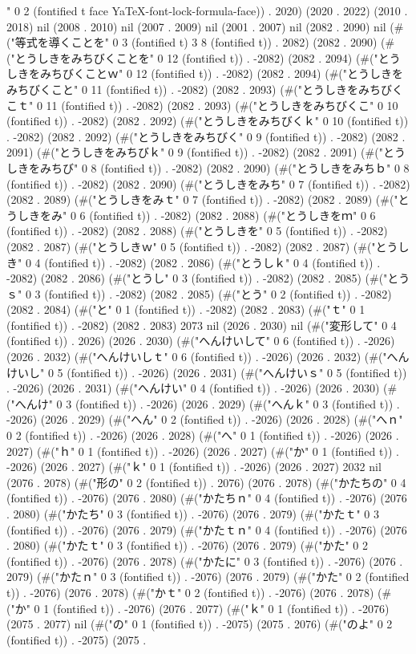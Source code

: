" 0 2 (fontified t face YaTeX-font-lock-formula-face)) . 2020) (2020 . 2022) (2010 . 2018) nil (2008 . 2010) nil (2007 . 2009) nil (2001 . 2007) nil (2082 . 2090) nil (#("等式を導くことを" 0 3 (fontified t) 3 8 (fontified t)) . 2082) (2082 . 2090) (#("とうしきをみちびくことを" 0 12 (fontified t)) . -2082) (2082 . 2094) (#("とうしきをみちびくことｗ" 0 12 (fontified t)) . -2082) (2082 . 2094) (#("とうしきをみちびくこと" 0 11 (fontified t)) . -2082) (2082 . 2093) (#("とうしきをみちびくこｔ" 0 11 (fontified t)) . -2082) (2082 . 2093) (#("とうしきをみちびくこ" 0 10 (fontified t)) . -2082) (2082 . 2092) (#("とうしきをみちびくｋ" 0 10 (fontified t)) . -2082) (2082 . 2092) (#("とうしきをみちびく" 0 9 (fontified t)) . -2082) (2082 . 2091) (#("とうしきをみちびｋ" 0 9 (fontified t)) . -2082) (2082 . 2091) (#("とうしきをみちび" 0 8 (fontified t)) . -2082) (2082 . 2090) (#("とうしきをみちｂ" 0 8 (fontified t)) . -2082) (2082 . 2090) (#("とうしきをみち" 0 7 (fontified t)) . -2082) (2082 . 2089) (#("とうしきをみｔ" 0 7 (fontified t)) . -2082) (2082 . 2089) (#("とうしきをみ" 0 6 (fontified t)) . -2082) (2082 . 2088) (#("とうしきをｍ" 0 6 (fontified t)) . -2082) (2082 . 2088) (#("とうしきを" 0 5 (fontified t)) . -2082) (2082 . 2087) (#("とうしきｗ" 0 5 (fontified t)) . -2082) (2082 . 2087) (#("とうしき" 0 4 (fontified t)) . -2082) (2082 . 2086) (#("とうしｋ" 0 4 (fontified t)) . -2082) (2082 . 2086) (#("とうし" 0 3 (fontified t)) . -2082) (2082 . 2085) (#("とうｓ" 0 3 (fontified t)) . -2082) (2082 . 2085) (#("とう" 0 2 (fontified t)) . -2082) (2082 . 2084) (#("と" 0 1 (fontified t)) . -2082) (2082 . 2083) (#("ｔ" 0 1 (fontified t)) . -2082) (2082 . 2083) 2073 nil (2026 . 2030) nil (#("変形して" 0 4 (fontified t)) . 2026) (2026 . 2030) (#("へんけいして" 0 6 (fontified t)) . -2026) (2026 . 2032) (#("へんけいしｔ" 0 6 (fontified t)) . -2026) (2026 . 2032) (#("へんけいし" 0 5 (fontified t)) . -2026) (2026 . 2031) (#("へんけいｓ" 0 5 (fontified t)) . -2026) (2026 . 2031) (#("へんけい" 0 4 (fontified t)) . -2026) (2026 . 2030) (#("へんけ" 0 3 (fontified t)) . -2026) (2026 . 2029) (#("へんｋ" 0 3 (fontified t)) . -2026) (2026 . 2029) (#("へん" 0 2 (fontified t)) . -2026) (2026 . 2028) (#("へｎ" 0 2 (fontified t)) . -2026) (2026 . 2028) (#("へ" 0 1 (fontified t)) . -2026) (2026 . 2027) (#("ｈ" 0 1 (fontified t)) . -2026) (2026 . 2027) (#("か" 0 1 (fontified t)) . -2026) (2026 . 2027) (#("ｋ" 0 1 (fontified t)) . -2026) (2026 . 2027) 2032 nil (2076 . 2078) (#("形の" 0 2 (fontified t)) . 2076) (2076 . 2078) (#("かたちの" 0 4 (fontified t)) . -2076) (2076 . 2080) (#("かたちｎ" 0 4 (fontified t)) . -2076) (2076 . 2080) (#("かたち" 0 3 (fontified t)) . -2076) (2076 . 2079) (#("かたｔ" 0 3 (fontified t)) . -2076) (2076 . 2079) (#("かたｔｎ" 0 4 (fontified t)) . -2076) (2076 . 2080) (#("かたｔ" 0 3 (fontified t)) . -2076) (2076 . 2079) (#("かた" 0 2 (fontified t)) . -2076) (2076 . 2078) (#("かたに" 0 3 (fontified t)) . -2076) (2076 . 2079) (#("かたｎ" 0 3 (fontified t)) . -2076) (2076 . 2079) (#("かた" 0 2 (fontified t)) . -2076) (2076 . 2078) (#("かｔ" 0 2 (fontified t)) . -2076) (2076 . 2078) (#("か" 0 1 (fontified t)) . -2076) (2076 . 2077) (#("ｋ" 0 1 (fontified t)) . -2076) (2075 . 2077) nil (#("の" 0 1 (fontified t)) . -2075) (2075 . 2076) (#("のよ" 0 2 (fontified t)) . -2075) (2075 . 